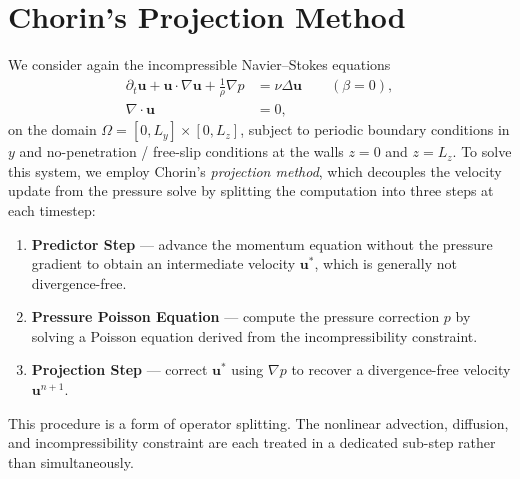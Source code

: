\section{Chorin's Projection Method}
We consider again the incompressible Navier--Stokes equations
\begin{align}
    \partial_t \mathbf{u} + \mathbf{u} \cdot \nabla \mathbf{u}
    + \frac{1}{\rho}\nabla p &= \nu \Delta \mathbf{u}
    \qquad (\beta = 0), \label{eq:ns_mom} \\
    \nabla \cdot \mathbf{u} &= 0, \label{eq:ns_div}
\end{align}
on the domain $\Omega = [0, L_y] \times [0, L_z]$, subject to periodic
boundary conditions in $y$ and no-penetration / free-slip conditions at
the walls $z = 0$ and $z = L_z$.
To solve this system, we employ Chorin's \textit{projection
method}, which decouples the velocity update from the pressure solve by splitting the computation into three steps at each timestep:
\begin{enumerate}
    \item \textbf{Predictor Step} — advance the momentum equation without the
          pressure gradient to obtain an intermediate velocity
          $\mathbf{u}^*$, which is generally not divergence-free.
    \item \textbf{Pressure Poisson Equation} — compute the pressure correction $p$
          by solving a Poisson equation derived from the incompressibility
          constraint.
    \item \textbf{Projection Step} — correct $\mathbf{u}^*$ using $\nabla p$
          to recover a divergence-free velocity $\mathbf{u}^{n+1}$.
\end{enumerate}
This procedure is a form of operator splitting. The nonlinear advection,
diffusion, and incompressibility constraint are each treated in a
dedicated sub-step rather than simultaneously.

